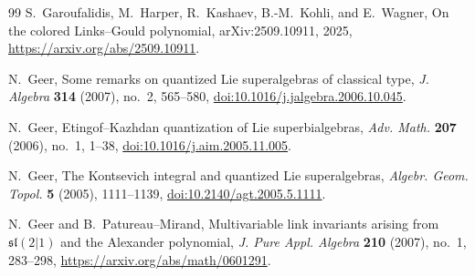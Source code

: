 \documentclass[11pt,a4paper]{article}
\theoremstyle{definition}
\theoremstyle{remark}
\begin{document}
\begin{thebibliography}{99}
S.~Garoufalidis, M.~Harper, R.~Kashaev, B.-M.~Kohli, and E.~Wagner,
\newblock On the colored Links--Gould polynomial,
\newblock arXiv:2509.10911, 2025,
\newblock \url{https://arxiv.org/abs/2509.10911}.

N.~Geer,
\newblock Some remarks on quantized Lie superalgebras of classical type,
\newblock \emph{J. Algebra} \textbf{314} (2007), no.~2, 565--580,
\newblock \href{https://doi.org/10.1016/j.jalgebra.2006.10.045}
{doi:10.1016/j.jalgebra.2006.10.045}.

N.~Geer,
\newblock Etingof--Kazhdan quantization of Lie superbialgebras,
\newblock \emph{Adv. Math.} \textbf{207} (2006), no.~1, 1--38,
\newblock \href{https://doi.org/10.1016/j.aim.2005.11.005}
{doi:10.1016/j.aim.2005.11.005}.

N.~Geer,
\newblock The Kontsevich integral and quantized Lie superalgebras,
\newblock \emph{Algebr. Geom. Topol.} \textbf{5} (2005), 1111--1139,
\newblock \href{https://doi.org/10.2140/agt.2005.5.1111}
{doi:10.2140/agt.2005.5.1111}.

N.~Geer and B.~Patureau--Mirand,
\newblock Multivariable link invariants arising from
\(\mathfrak{sl}(2|1)\) and the Alexander polynomial,
\newblock \emph{J. Pure Appl. Algebra} \textbf{210} (2007), no.~1,
283--298,
\newblock \url{https://arxiv.org/abs/math/0601291}.

\end{thebibliography}
\end{document}
